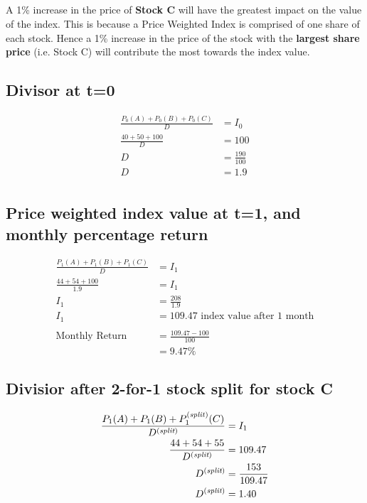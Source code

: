 \documentclass[12pt]{article}
\begin{document}
\subsection{}
A 1\% increase in the price of \textbf{Stock C} will have the greatest impact on the value of the index. This is because a Price Weighted Index is comprised of one share of each stock. Hence a 1\% increase in the price of the stock with the \textbf{largest share price} (i.e. Stock C) will contribute the most towards the index value.

\subsection{Divisor at t=0}
\begin{align*}
	\frac{P_0(A) + P_0(B) + P_0(C)}{D} &= I_0\\
	\frac{40+50+100}{D} &= 100\\
	D &= \frac{190}{100} \\
	D &= 1.9\\
\end{align*}

\subsection{Price weighted index value at t=1, and monthly \newline percentage return}
\begin{align*}
	\frac{P_1(A) + P_1(B) + P_1(C)}{D} &= I_1\\
	\frac{44+54+100}{1.9} &= I_1\\
	I_1 &= \frac{208}{1.9} \\
	I_1 &= 109.47 \text{ index value after 1 month}\\
	&\\
	\text{Monthly Return} &= \frac{109.47-100}{100}\\
	&= 9.47\%
\end{align*}

\subsection{Divisior after 2-for-1 stock split for stock C}
\begin{align*}
	\frac{P_1(A) + P_1(B) + P_1^{\text{(\textit{split})}}(C)}{D^{(\textit{split})}} &= I_1\\
	\frac{44+54+55}{D^{(\textit{split})}} &= 109.47\\
	D^{(\textit{split})} &= \frac{153}{109.47} \\
	D^{(\textit{split})} &= 1.40\\
\end{align*}
\end{document}
